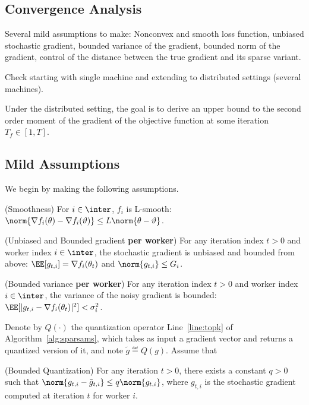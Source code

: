 \documentclass[11pt]{article}
\begin{document}
\subsection{Convergence Analysis}

Several mild assumptions to make: Nonconvex and smooth loss function, unbiased stochastic gradient, bounded variance of the gradient, bounded norm of the gradient, control of the distance between the true gradient and its sparse variant.

Check \citep{chen2020quantized} starting with single machine  and extending to distributed settings (several machines).


Under the distributed setting, the goal is to derive an upper bound to the second order moment of the gradient of the objective function at some iteration $T_f \in [1, T]$.

\subsection{Mild Assumptions}
We begin by making the following assumptions.

\begin{assumption}\label{ass:smooth}(Smoothness)
For $i \in \inter$, $f_i$ is  L-smooth: $\norm{\nabla f_i (\theta) - \nabla f_i (\vartheta)} \leq L \norm{\theta-\vartheta}$.
\end{assumption}

\begin{assumption}\label{ass:boundgrad}(Unbiased and Bounded gradient \textbf{per worker})
For any iteration index $t >0$ and worker index $i \in \inter$, the stochastic gradient is unbiased and bounded from above: $\EE[g_{t,i}] = \nabla f_i(\theta_t)$ and $\norm{g_{t,i}} \leq G_i$.
\end{assumption}

\begin{assumption}\label{ass:quant}(Bounded variance \textbf{per worker})
For any iteration index $t >0$ and worker index $i \in \inter$, the variance of the noisy gradient is bounded: $\EE[|g_{t,i} - \nabla f_i(\theta_t)|^2] < \sigma_i^2$.
\end{assumption}

Denote by $Q(\cdot)$ the quantization operator Line~\ref{line:topk} of Algorithm~\ref{alg:sparsams}, which takes as input a gradient vector and returns a quantized version of it, and note $\tilde{g} \eqdef Q(g)$.
Assume that
\begin{assumption}\label{ass:var}(Bounded Quantization)
For any iteration $t >0$, there exists a constant $q >0$ such that $\norm{g_{t,i} - \tilde{g}_{t,i}} \leq q \norm{g_{t,i}}$, where $g_{t,i}$ is the stochastic gradient computed at iteration $t$ for worker $i$.
\end{assumption}
\end{document}
